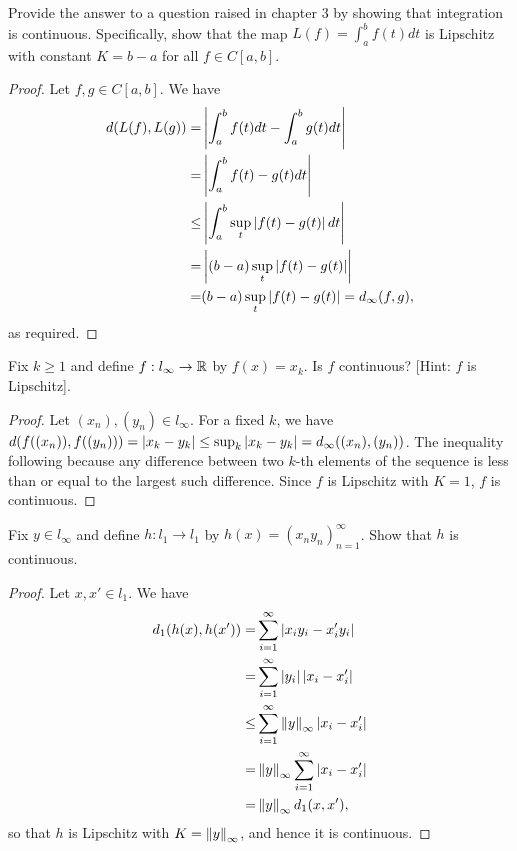 \begin{exercise}{26}
Provide the answer to a question raised in chapter 3 by showing that integration is continuous.
Specifically, show that the map $L(f)=\int_a^b f(t) dt$ is Lipschitz with constant $K =b-a$ for all $f\in C[a,b]$.
\end{exercise}
\begin{proof}
Let $f,g\in C[a,b]$.
We have 
\begin{align*}
    d(L(f),L(g))
    =& \left\lvert \int^b_a f(t)dt - \int^b_a g(t)dt\right\rvert\\
    =& \left\lvert \int^b_a f(t) - g(t)dt\right\rvert\\
    \leq& \left\lvert \int^b_a \sup_t \left\lvert f(t)-g(t)\right\rvert dt\right\rvert\\
    =& \left\lvert (b-a) \sup_t \left\lvert f(t)-g(t)\right\rvert\right\rvert\\
    =& (b-a) \sup_t \left\lvert f(t)-g(t)\right\rvert
    = d_\infty(f,g),
\end{align*}
as required.
\end{proof} 

\begin{exercise}{27}
Fix $k\geq 1$ and define $f:l_\infty \to \mathbb{R}$ by $f(x) =x_k$.
Is $f$ continuous?
[Hint: $f$ is Lipschitz].
\end{exercise}
\begin{proof}
Let $(x_n),(y_n) \in l_\infty$.
For a fixed $k$, we have 
$d(f((x_n)),f((y_n))) = \left\lvert x_k-y_k\right\rvert \leq \sup_k\left\lvert x_k-y_k\right\rvert = d_\infty((x_n),(y_n))$.
The inequality following because any difference between two $k$-th elements of the sequence is less than or equal to the largest such difference.
Since $f$ is Lipschitz with $K=1$, $f$ is continuous.
\end{proof} 

\begin{exercise}{29}
Fix $y\in l_\infty$ and define $h: l_1\to l_1$ by $h(x)=(x_ny_n)^\infty_{n=1}$.
Show that $h$ is continuous.
\end{exercise}
\begin{proof}
Let $x,x'\in l_1$.
We have 
\begin{align*}
    d_1(h(x),h(x'))
    =& \sum_{i=1}^\infty \left\lvert x_iy_i-x'_iy_i\right\rvert\\
    =& \sum_{i=1}^\infty \left\lvert y_i\right\rvert\left\lvert x_i-x'_i\right\rvert\\
    \leq& \sum_{i=1}^\infty \left\lVert y\right\rVert_\infty\left\lvert x_i-x'_i\right\rvert\\
    =& \left\lVert y\right\rVert_\infty\sum_{i=1}^\infty \left\lvert x_i-x'_i\right\rvert\\
    =& \left\lVert y\right\rVert_\infty d_1(x,x'),
\end{align*}
so that $h$ is Lipschitz with $K=\left\lVert y\right\rVert_\infty$, and hence it is continuous.
\end{proof} 

